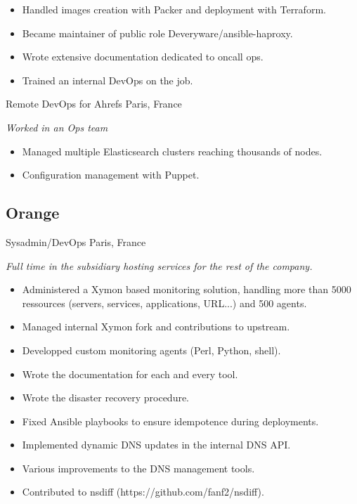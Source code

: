 \documentclass[]{friggeri-cv} %
\begin{document}
\begin{entrylist}
{\begin{itemize}
    \item Handled images creation with Packer and deployment with Terraform.
    \item Became maintainer of public role Deveryware/ansible-haproxy.
    \item Wrote extensive documentation dedicated to oncall ops.
    \item Trained an internal DevOps on the job.
  \end{itemize}
}
 {Remote DevOps for Ahrefs} {Paris, France} {
  \emph{Worked in an Ops team}
  \begin{itemize}
    \item Managed multiple Elasticsearch clusters reaching thousands of nodes.
    \item Configuration management with Puppet.
  \end{itemize}
}
\end{entrylist}

\pagebreak

\subsection{Orange}
\begin{entrylist}
 {Sysadmin/DevOps} {Paris, France} {
  \emph{Full time in the subsidiary hosting services for the rest of the company.}
  \begin{itemize}
    \item Administered a Xymon based monitoring solution, handling more than 5000 ressources (servers, services, applications, URL...) and 500 agents.
    \item Managed internal Xymon fork and contributions to upstream.
    \item Developped custom monitoring agents (Perl, Python, shell).
    \item Wrote the documentation for each and every tool.
    \item Wrote the disaster recovery procedure.
    \item Fixed Ansible playbooks to ensure idempotence during deployments.
    \item Implemented dynamic DNS updates in the internal DNS API.
    \item Various improvements to the DNS management tools.
    \item Contributed to nsdiff (https://github.com/fanf2/nsdiff).
  \end{itemize}
}
\end{entrylist}
\end{document}
